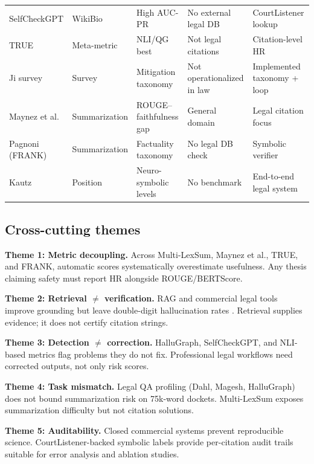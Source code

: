 \begin{table}[!t]
\begin{tabular}{@{}p{2.5cm}p{2.2cm}p{2.4cm}p{3.8cm}p{3.5cm}@{}}
SelfCheckGPT \cite{manakul2023selfcheckgpt} & WikiBio & High AUC-PR & No external legal DB & CourtListener lookup \\
TRUE \cite{honovich2022true} & Meta-metric & NLI/QG best & Not legal citations & Citation-level HR \\
Ji survey \cite{ji2023hallucinationsurvey} & Survey & Mitigation taxonomy & Not operationalized in law & Implemented taxonomy + loop \\
Maynez et al.\ \cite{maynez2020faithfulness} & Summarization & ROUGE--faithfulness gap & General domain & Legal citation focus \\
Pagnoni (FRANK) \cite{pagnoni2021factuality} & Summarization & Factuality taxonomy & No legal DB check & Symbolic verifier \\
Kautz \cite{kautz2022thirdaisummer} & Position & Neuro-symbolic levels & No benchmark & End-to-end legal system \\
\bottomrule
\end{tabular}
\end{table}

\subsection{Cross-cutting themes}

\textbf{Theme 1: Metric decoupling.}
Across Multi-LexSum, Maynez et al., TRUE, and FRANK, automatic scores systematically overestimate usefulness. Any thesis claiming safety must report HR alongside ROUGE/BERTScore.

\textbf{Theme 2: Retrieval $\neq$ verification.}
RAG and commercial legal tools improve grounding but leave double-digit hallucination rates \cite{magesh2025hallucinationfree}. Retrieval supplies evidence; it does not certify citation strings.

\textbf{Theme 3: Detection $\neq$ correction.}
HalluGraph, SelfCheckGPT, and NLI-based metrics flag problems they do not fix. Professional legal workflows need corrected outputs, not only risk scores.

\textbf{Theme 4: Task mismatch.}
Legal QA profiling (Dahl, Magesh, HalluGraph) does not bound summarization risk on 75k-word dockets. Multi-LexSum exposes summarization difficulty but not citation solutions.

\textbf{Theme 5: Auditability.}
Closed commercial systems prevent reproducible science. CourtListener-backed symbolic labels provide per-citation audit trails suitable for error analysis and ablation studies.

